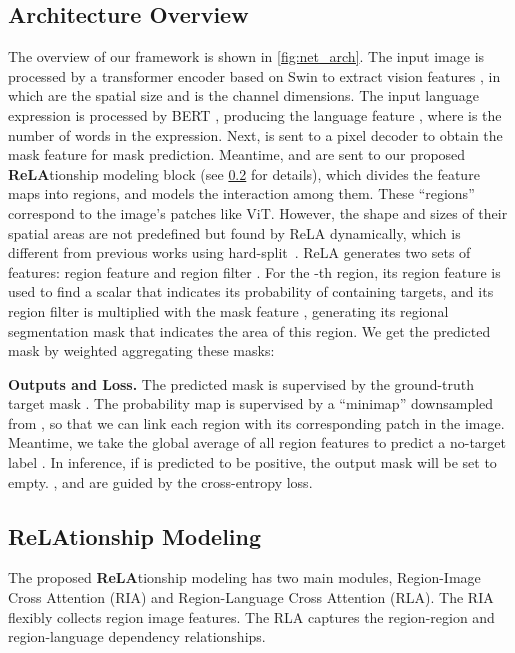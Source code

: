 \documentclass[10pt,twocolumn,letterpaper]{article}
\let\oldsubsection\subsection
\renewcommand{\subsection}[1]{\oldsubsection{#1} }
\begin{document}
\subsection{Architecture Overview}

The overview of our framework is shown in \cref{fig:net_arch}. The input image is processed by a transformer encoder based on Swin \cite{liu2021swin} to extract vision features , in which  are the spatial size and  is the channel dimensions. The input language expression is processed by BERT \cite{devlin2018bert}, producing the language feature , where  is the number of words in the expression. 
Next,  is sent to a pixel decoder to obtain the mask feature  for mask prediction. Meantime,  and  are sent to our proposed \textbf{ReLA}tionship modeling block (see \cref{sec:ReLA} for details), which divides the feature maps into  regions, and models the interaction among them. These ``regions'' correspond to the image's  patches like ViT\cite{dosovitskiy2020image}. However, the shape and sizes of their spatial areas are not predefined but found by ReLA dynamically, which is different from previous works using hard-split~\cite{dosovitskiy2020image,xie2021segformer,strudel2021segmenter,kim2022restr}. 
ReLA generates two sets of features: region feature  and region filter . For the -th region, its region feature  is used to find a scalar  that indicates its probability of containing targets, and its region filter  is multiplied with the mask feature , generating its regional segmentation mask  that indicates the area of this region. We get the predicted mask by weighted aggregating these masks: 
\vspace{-2mm}

\textbf{Outputs and Loss.} The predicted mask  is supervised by the ground-truth target mask . The  probability map  is supervised by a ``minimap'' downsampled from , so that we can link each region with its corresponding patch in the image. Meantime, we take the global average of all region features  to predict a no-target label . In inference, if  is predicted to be positive, the output mask  will be set to empty. ,  and  are guided by the cross-entropy loss.


\subsection{ReLAtionship Modeling}\label{sec:ReLA}

The proposed \textbf{ReLA}tionship modeling has two main modules, Region-Image Cross Attention (RIA) and Region-Language Cross Attention (RLA). The RIA flexibly collects region image features. The RLA captures the region-region and region-language dependency relationships.
\end{document}
